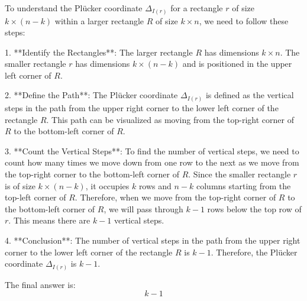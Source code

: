 To understand the Plücker coordinate \(\Delta_{I(r)}\) for a rectangle \(r\) of size \(k \times (n-k)\) within a larger rectangle \(R\) of size \(k \times n\), we need to follow these steps:

1. **Identify the Rectangles**: The larger rectangle \(R\) has dimensions \(k \times n\). The smaller rectangle \(r\) has dimensions \(k \times (n-k)\) and is positioned in the upper left corner of \(R\).

2. **Define the Path**: The Plücker coordinate \(\Delta_{I(r)}\) is defined as the vertical steps in the path from the upper right corner to the lower left corner of the rectangle \(R\). This path can be visualized as moving from the top-right corner of \(R\) to the bottom-left corner of \(R\).

3. **Count the Vertical Steps**: To find the number of vertical steps, we need to count how many times we move down from one row to the next as we move from the top-right corner to the bottom-left corner of \(R\). Since the smaller rectangle \(r\) is of size \(k \times (n-k)\), it occupies \(k\) rows and \(n-k\) columns starting from the top-left corner of \(R\). Therefore, when we move from the top-right corner of \(R\) to the bottom-left corner of \(R\), we will pass through \(k-1\) rows below the top row of \(r\). This means there are \(k-1\) vertical steps.

4. **Conclusion**: The number of vertical steps in the path from the upper right corner to the lower left corner of the rectangle \(R\) is \(k-1\). Therefore, the Plücker coordinate \(\Delta_{I(r)}\) is \(k-1\).

The final answer is:
\[
\boxed{k-1}
\]